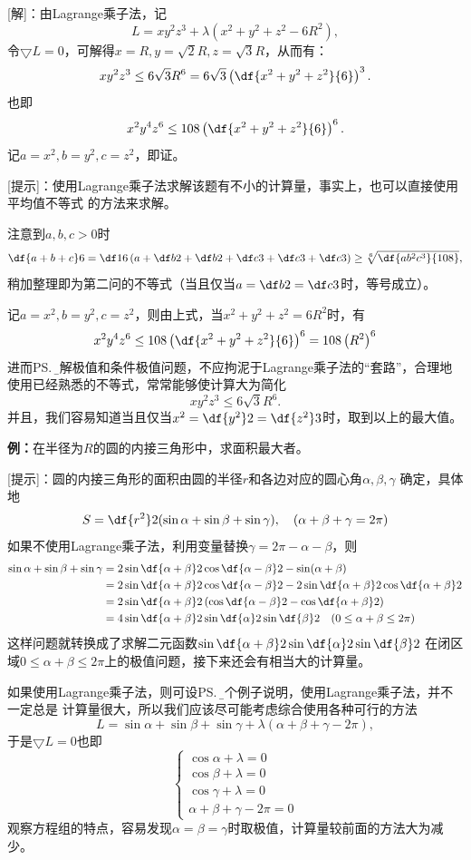 [解]：由Lagrange乘子法，记
$$L=xy^2z^3+\lambda(x^2+y^2+z^2-6R^2),$$
令$\bigtriangledown L=0$，可解得$x=R,y=\sqrt2 R,z=\sqrt3 R$，从而有：
$$xy^2z^3\leq 6\sqrt 3R^6=6\sqrt 3\left(\df{x^2+y^2+z^2}{6}\right)^3.$$
也即
$$x^2y^4z^6\leq 108\left(\df{x^2+y^2+z^2}{6}\right)^6.$$
记$a=x^2,b=y^2,c=z^2$，即证。\fin

[提示]：使用Lagrange乘子法求解该题有不小的计算量，事实上，也可以直接使用平均值不等式
的方法来求解。

注意到$a,b,c>0$时
$$\df{a+b+c}6=\df16\left(a+\df b2+\df b2+\df c3+\df c3+\df c3\right)
\geq \sqrt[6]{\df{ab^2c^3}{108}},$$
稍加整理即为第二问的不等式（当且仅当$a=\df b2=\df c3$时，等号成立）。

记$a=x^2,b=y^2,c=z^2$，则由上式，当$x^2+y^2+z^2=6R^2$时，有
$$x^2y^4z^6\leq108\left(\df{x^2+y^2+z^2}{6}\right)^6
=108\left(R^2\right)^6$$
进而\ps{\b 求解极值和条件极值问题，不应拘泥于Lagrange乘子法的“套路”，合理地
使用已经熟悉的不等式，常常能够使计算大为简化}
$$xy^2z^3\leq6\sqrt3R^6.$$
并且，我们容易知道当且仅当$x^2=\df{y^2}2=\df{z^2}3$时，取到以上的最大值。

{\bf 例：}在半径为$R$的圆的内接三角形中，求面积最大者。

[提示]：圆的内接三角形的面积由圆的半径$r$和各边对应的圆心角$\alpha,\beta,\gamma$
确定，具体地
$$S=\df{r^2}2(\sin\alpha+\sin\beta+\sin\gamma),\quad
(\alpha+\beta+\gamma=2\pi)$$
如果不使用Lagrange乘子法，利用变量替换$\gamma=2\pi-\alpha-\beta$，则
\begin{align*}
	\sin\alpha+\sin\beta+\sin\gamma
	&=2\sin\df{\alpha+\beta}2\cos\df{\alpha-\beta}2-\sin(\alpha+\beta)\\
	&=2\sin\df{\alpha+\beta}2\cos\df{\alpha-\beta}2-2\sin\df{\alpha+\beta}2
	\cos\df{\alpha+\beta}2\\
	&=2\sin\df{\alpha+\beta}2\left(\cos\df{\alpha-\beta}2
	-\cos\df{\alpha+\beta}2\right)\\
	&=4\sin\df{\alpha+\beta}2\sin\df{\alpha}2\sin\df{\beta}2
	\quad(0\leq\alpha+\beta\leq2\pi)
\end{align*}
这样问题就转换成了求解二元函数$\sin\df{\alpha+\beta}2\sin\df{\alpha}2\sin\df{\beta}2$
在闭区域$0\leq\alpha+\beta\leq2\pi$上的极值问题，接下来还会有相当大的计算量。

如果使用Lagrange乘子法，则可设\ps{\b 这个例子说明，使用Lagrange乘子法，并不一定总是
计算量很大，所以我们应该尽可能考虑综合使用各种可行的方法}
$$L=\sin\alpha+\sin\beta+\sin\gamma+\lambda(\alpha+\beta+\gamma-2\pi),$$
于是$\bigtriangledown L=0$也即
$$
	\left\{\begin{array}{l}
		\cos\alpha+\lambda=0\\
		\cos\beta+\lambda=0\\
		\cos\gamma+\lambda=0\\
		\alpha+\beta+\gamma-2\pi=0
	\end{array}\right.
$$
观察方程组的特点，容易发现$\alpha=\beta=\gamma$时取极值，计算量较前面的方法大为减少。

